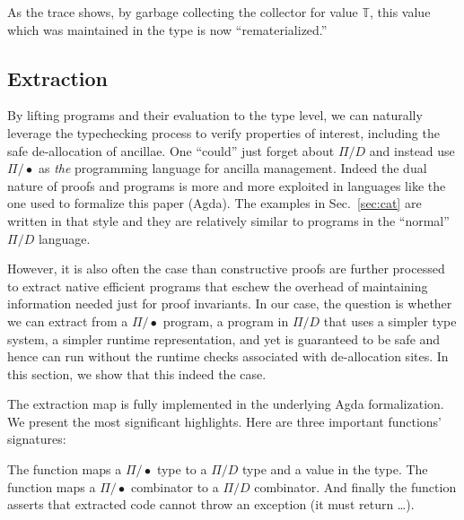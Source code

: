 \documentclass[sigplan,10pt,review,anonymous]{acmart}
\newcommand{\Afun}[1]{\AgdaFunction{#1}}
\newcommand{\Acon}[1]{\AgdaInductiveConstructor{#1}}
\begin{document}
{\center}

As the trace shows, by garbage collecting the collector for value
$\mathbb{T}$, this value which was maintained in the type is now
``rematerialized.''

\subsection{Extraction}

By lifting programs and their evaluation to the type level, we can
naturally leverage the typechecking process to verify properties of
interest, including the safe de-allocation of ancillae. One ``could''
just forget about $\Pi/D$ and instead use $\Pi/\bullet$ as \emph{the}
programming language for ancilla management. Indeed the dual nature of
proofs and programs is more and more exploited in languages like the
one used to formalize this paper (Agda). The examples in
Sec.~\ref{sec:cat} are written in that style and they are relatively
similar to programs in the ``normal'' $\Pi/D$ language.

However, it is also often the case than constructive proofs are
further processed to extract native efficient programs that eschew
the overhead of maintaining information needed just for proof
invariants. In our case, the question is whether we can extract from
a $\Pi/\bullet$ program, a program in $\Pi/D$ that uses a simpler type
system, a simpler runtime representation, and yet is guaranteed to be
safe and hence can run without the runtime checks associated with
de-allocation sites. In this section, we show that this indeed the
case.


The extraction map is fully implemented in the underlying Agda
formalization. We present the most significant highlights. Here are
three important functions' signatures:

\EXTsig{}

\vspace{-\baselineskip}

\noindent The function \Afun{Ext𝕌} maps a $\Pi/\bullet$ type to a $\Pi/D$ type
and a value in the type. The function \Afun{Ext∙⟶} maps a
$\Pi/\bullet$ combinator to a $\Pi/D$ combinator. And finally the
function \Afun{Ext≡} asserts that extracted code cannot throw an
exception (it must return \Acon{just}\ldots).
\end{document}
